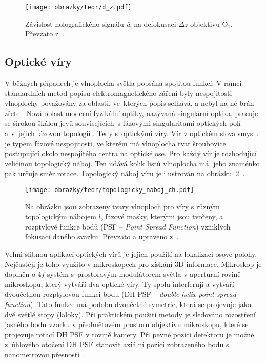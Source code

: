 \documentclass[12pt, a4paper, twoside]{article}
\begin{document}
\begin{figure}[t!]
  \centering
  \texttt{[image: obrazky/teor/d\_z.pdf]}
  \caption{Závislost holografického signálu $\bar{w}$ na defokusaci $\Delta z$ objektivu O$_1$. Převzato z~\cite{zbynek_disertace}.}
  \label{fig:defocus}
\end{figure}

\subsection*{Optické víry}

V běžných případech je vlnoplocha světla popsána spojitou funkcí. V rámci standardních metod popisu elektromagnetického záření byly ne\-spo\-ji\-to\-sti vlnoplochy považovány za oblasti, ve~kterých popis selhává, a nebyl na ně brán zřetel. Nová oblast moderní fyzikální optiky, nazývaná singulární optika, pracuje se širokou škálou jevů souvisejících~s fázovými singularitami optických polí a~s~jejich fázovou topologií \cite{bouchal2003}. Tedy s~optickými víry. Vír v optickém slova smyslu je typem fázové ne\-spo\-ji\-tost\-i, ve kterém má vlnoplocha tvar šroubovice postupující okolo nespojitého centra na optické ose. Pro každý vír je rozhodující veličinou topologický náboj. Ten udává kolik listů vlnoplocha má, jeho znaménko pak určuje směr rotace. Topologický náboj víru je ilustrován na obrázku~\ref{fig:top_naboj}~\cite{olomouc-viry}.



\begin{figure}[h!]
  \centering
  \texttt{[image: obrazky/teor/topologicky\_naboj\_ch.pdf]}
  \caption[Ilustrace vírového svazku.]{Na obrázku jsou zobrazeny tvary vlnoploch pro víry s různým topologickým nábojem $l$, fázové masky, kterými jsou tvořeny, a rozptylové funkce bodů (PSF -- \emph{Point Spread Function}) vzniklých fokusací daného svazku. Převzato a upraveno z~\cite{olomouc-viry}.}
  \label{fig:top_naboj}
\end{figure}

Velmi slibnou aplikací optických vírů je jejich použití na lokalizaci osové polohy. Nejčastěji je toho využito v mikroskopech pro získání 3D informace. Mikroskop je doplněn o 4$f$ systém s~prostorovým modulátorem světla v aperturní rovině mikroskopu, který vytváří dva optické víry. Ty spolu interferují a vytváří dvoučetnou rozptylovou funkci bodu (DH PSF -- \emph{double helix point spread function}). Tato funkce má podobu dvoučetné symetrie, která se projevuje jako dvě světlé stopy (laloky). Při praktickém použití metody je sledováno rozostření jasného bodu vzorku v předmětovém prostoru objektivu mikroskopu, které se projevuje rotací DH PSF v rovině kamery. Při pevné pozici detektoru je možné z~úhlového otočení DH PSF stanovit axiální pozici zobrazeného bodu s nanometrovou přesností \cite{Bouchal2015}.
\end{document}
